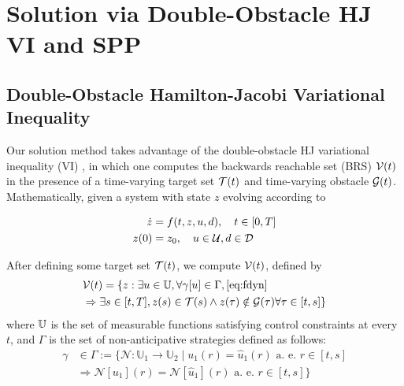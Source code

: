 \section{Solution via Double-Obstacle HJ VI and SPP\label{sec:solution}}
\subsection{Double-Obstacle Hamilton-Jacobi Variational Inequality}
Our solution method takes advantage of the double-obstacle HJ variational inequality (VI) \cite{Fisac15}, in which one computes the backwards reachable set (BRS) $\mathcal{V}(t)$ in the presence of a time-varying target set $\mathcal{T}(t)$ and time-varying obstacle $\mathcal{G}(t)$. Mathematically, given a system with state $z$ evolving according to

\begin{equation}
\label{eq:fdyn} %
\begin{aligned}
\dot{z} &= f(t, z, u, d), \quad t \in [0, T] \\
z(0) &= z_0, \quad u \in \cset, d \in \dset
\end{aligned}
\end{equation}

After defining some target set $\mathcal{T}(t)$, we compute $\mathcal{V}(t)$, defined by 
%
\begin{equation}
\label{eq:brs}
\begin{aligned}
&\mathcal{V}(t) = \{z: \exists u \in \mathbb{U}, \forall \gamma[u] \in \Gamma, \eqref{eq:fdyn} \\
&\Rightarrow \exists s \in [t, T], z(s) \in \mathcal{T}(s) \wedge z(\tau) \notin \mathcal{G}(\tau) \forall \tau \in [t, s]\}
\end{aligned}
\end{equation}
%
\noindent where $\mathbb{U}$ is the set of measurable functions satisfying control constraints at every $t$, and $\Gamma$ is the set of non-anticipative strategies \cite{Mitchell05} defined as follows:
\begin{equation}
\begin{aligned}
\gamma &\in \Gamma := \{\mathcal{N}: \mathbb{U}_1 \rightarrow \mathbb{U}_2 \mid  u_1(r) = \hat{u}_1(r) \text{ a. e. } r\in[t,s] \\
& \Rightarrow \mathcal{N}[u_1](r) = \mathcal{N}[\hat{u}_1](r) \text{ a. e. } r\in[t,s]\}
\end{aligned}
\end{equation}

